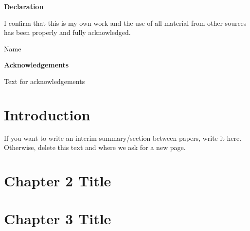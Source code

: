 \documentclass[11pt,oneside]{report} %
\begin{document}
\newpage
\thispagestyle{plain}
    \Huge
    \textbf{Declaration}
    
    \vspace{1cm}
    \large
   \noindent
    I confirm that this is my own work and the use of all material from other sources has been properly and fully acknowledged.
   
   
   
   \vspace{1 cm}
   \noindent
   Name
 

\newpage
\thispagestyle{plain}
    \Huge
    \textbf{Acknowledgements}
 
    \vspace{1cm}
    \large
    Text for acknowledgements
\tableofcontents{}

\listoffigures 
\listoftables 

\chapter{Introduction}


\newpage
If you want to write an interim summary/section between papers, write it here. Otherwise, delete this text and where we ask for a new page.

\chapter{Chapter 2 Title}



\chapter{Chapter 3 Title}

\end{document}
